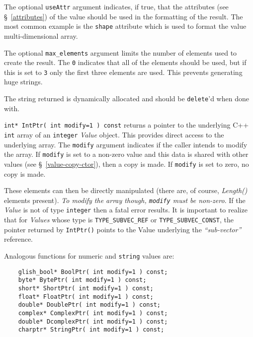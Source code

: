\begin{sloppy}
\begin{list}{}{}
The optional {\tt useAttr} argument indicates, if true, that the attributes
(see \S~\ref{attributes}) of the value should be used in the formatting of the
result. The most common example is the {\tt shape} attribute  which is
used to format the value multi-dimensional array.

The optional {\tt max\_elements} argument limits the number of
elements used to create the result. The {\tt 0} indicates that all of the
elements should be used, but if this is set to {\tt 3} only the first three
elements are used. This prevents generating huge strings.

The string returned is dynamically allocated and should be {\tt delete}'d
when done with.

\item[{\tt int* IntPtr( int modify=1 ) const}]
\label{value-intptr}
returns a pointer to the underlying
C++ {\tt int} array of an {\tt integer} {\em Value} object. This provides
direct access to the underlying array. The {\tt modify} argument indicates
if the caller intends to modify the array. If {\tt modify} is set to a non-zero
value and this data is shared with other values (see \S~\ref{value-copy-ctor}),
then a copy is made. If {\tt modify} is set to zero, no copy is made.

These elements can then be directly manipulated (there are, of course, {\em Length()}
elements present).  {\em To modify the array though, {\tt modify} must be non-zero}.
If the {\em Value} is not of type {\tt integer} then a fatal error results. It is
important to realize that for {\em Values} whose type is {\tt TYPE\_SUBVEC\_REF} or
{\tt TYPE\_SUBVEC\_CONST}, the pointer returned by {\tt IntPtr()} points to
the Value underlying the {\em ``sub-vector''} reference.

Analogous functions for numeric and {\tt string} values are:
\begin{verbatim}
    glish_bool* BoolPtr( int modify=1 ) const;
    byte* BytePtr( int modify=1 ) const;
    short* ShortPtr( int modify=1 ) const;
    float* FloatPtr( int modify=1 ) const;
    double* DoublePtr( int modify=1 ) const;
    complex* ComplexPtr( int modify=1 ) const;
    double* DcomplexPtr( int modify=1 ) const;
    charptr* StringPtr( int modify=1 ) const;
\end{verbatim}


\end{list}
\end{sloppy}

